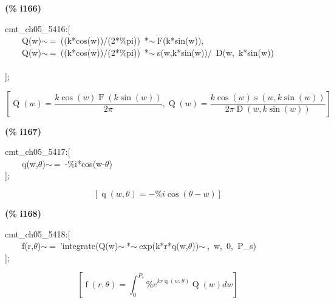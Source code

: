 \documentclass[fleqn]{article}
\begin{document}
\noindent
\begin{minipage}[t]{4.000000em}\color{red}\bfseries
(\% i166)	
\end{minipage}
\begin{minipage}[t]{\textwidth}\color{blue}
cmt\_ch05\_5416:[\\
\ \ \ \ Q(w)\ensuremath{\sim\ }=\ ((k*cos(w))/(2*\%pi))\ *\ensuremath{\sim\ }F(k*sin(w)),\\
\ \ \ \ Q(w)\ensuremath{\sim\ }=\ ((k*cos(w))/(2*\%pi))\ *\ensuremath{\sim\ }s(w,k*sin(w))/\ D(w,\ k*sin(w))\\
\\
];
\end{minipage}
\[\displaystyle \tag{\% o166} 
\left[ \operatorname{Q}(w)=\frac{k \cos{(w)} \operatorname{F}\left( k \sin{(w)}\right) }{2 \ensuremath{\pi} }\operatorname{,}\operatorname{Q}(w)=\frac{k \cos{(w)} \operatorname{s}\left( w\operatorname{,}k \sin{(w)}\right) }{2 \ensuremath{\pi}  \operatorname{D}\left( w\operatorname{,}k \sin{(w)}\right) }\right] \mbox{}
\]


\noindent
\begin{minipage}[t]{4.000000em}\color{red}\bfseries
(\% i167)	
\end{minipage}
\begin{minipage}[t]{\textwidth}\color{blue}
cmt\_ch05\_5417:[\\
\ \ \ \ q(w,\ensuremath{\theta})\ensuremath{\sim\ }=\ -\%i*cos(w-\ensuremath{\theta})\\
];
\end{minipage}
\[\displaystyle \tag{\% o167} 
\left[ \operatorname{q}\left( w\operatorname{,}\theta \right) =-\% i \cos{\left( \theta -w\right) }\right] \mbox{}
\]


\noindent
\begin{minipage}[t]{4.000000em}\color{red}\bfseries
(\% i168)	
\end{minipage}
\begin{minipage}[t]{\textwidth}\color{blue}
cmt\_ch05\_5418:[\\
\ \ \ \ f(r,\ensuremath{\theta})\ensuremath{\sim\ }=\ 'integrate(Q(w)\ensuremath{\sim\ }*\ensuremath{\sim\ }exp(k*r*q(w,\ensuremath{\theta}))\ensuremath{\sim\ },\ w,\ 0,\ P\_s)\\
];
\end{minipage}
\[\displaystyle \tag{\% o168} 
\left[ \operatorname{f}\left( r\operatorname{,}\theta \right) =\int_{0}^{{P_s}}{\left. {{\% e}^{k r \operatorname{q}\left( w\operatorname{,}\theta \right) }} \operatorname{Q}(w)dw\right.}\right] \mbox{}
\]
\end{document}
